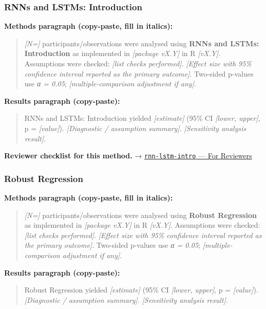\documentclass[
]{article}
\begin{document}
\subsubsection{RNNs and LSTMs:
Introduction}\label{rnns-and-lstms-introduction}

\textbf{Methods paragraph (copy-paste, fill in italics):}

\begin{quote}
\emph{{[}N={]}} participants/observations were analysed using
\textbf{RNNs and LSTMs: Introduction} as implemented in \emph{{[}package
vX.Y{]}} in R \emph{{[}vX.Y{]}}. Assumptions were checked: \emph{{[}list
checks performed{]}}. \emph{{[}Effect size with 95\% confidence interval
reported as the primary outcome{]}}. Two-sided p-values use \emph{α =
0.05}; \emph{{[}multiple-comparison adjustment if any{]}}.
\end{quote}

\textbf{Results paragraph (copy-paste):}

\begin{quote}
RNNs and LSTMs: Introduction yielded \emph{{[}estimate{]}} (95\% CI
\emph{{[}lower, upper{]}}, p = \emph{{[}value{]}}). \emph{{[}Diagnostic
/ assumption summary{]}}. \emph{{[}Sensitivity analysis result{]}}.
\end{quote}

\textbf{Reviewer checklist for this method.} →
\href{../chapters/13-ml/rnn-lstm-intro.Rmd\#for-reviewers}{\texttt{rnn-lstm-intro}
--- For Reviewers}

\subsubsection{Robust Regression}\label{robust-regression}

\textbf{Methods paragraph (copy-paste, fill in italics):}

\begin{quote}
\emph{{[}N={]}} participants/observations were analysed using
\textbf{Robust Regression} as implemented in \emph{{[}package vX.Y{]}}
in R \emph{{[}vX.Y{]}}. Assumptions were checked: \emph{{[}list checks
performed{]}}. \emph{{[}Effect size with 95\% confidence interval
reported as the primary outcome{]}}. Two-sided p-values use \emph{α =
0.05}; \emph{{[}multiple-comparison adjustment if any{]}}.
\end{quote}

\textbf{Results paragraph (copy-paste):}

\begin{quote}
Robust Regression yielded \emph{{[}estimate{]}} (95\% CI \emph{{[}lower,
upper{]}}, p = \emph{{[}value{]}}). \emph{{[}Diagnostic / assumption
summary{]}}. \emph{{[}Sensitivity analysis result{]}}.
\end{quote}
\end{document}
